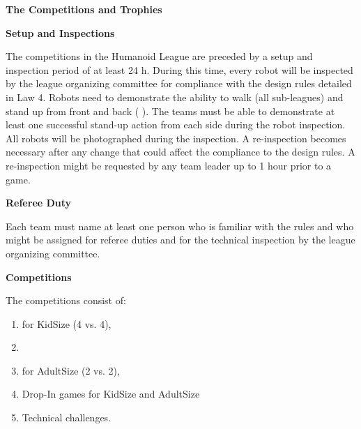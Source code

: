 \clearpage
\sffamily
{\bfseries\color[rgb]{0.4,0.4,0.4}The Competitions and Trophies}
{}


\bigskip

{\bfseries Setup and Inspections}

\headlinebox

The competitions in the Humanoid League are preceded by a setup and inspection
period of at least 24 h.
During this time, every robot will be inspected by the league organizing
committee for compliance with the design rules detailed in Law 4.
Robots need to demonstrate the ability to walk (all sub-leagues) and stand up
from front and back ( ).
The teams must be able to demonstrate at least one successful stand-up action
from each side during the robot inspection.
All robots will be photographed during the inspection.
A re-inspection becomes necessary after any change that could affect the
compliance to the design rules.
A re-inspection might be requested by any team leader up to 1 hour prior to a game.

\bigskip

{\bfseries Referee Duty}

\headlinebox

Each team must name at least one person who is familiar with the rules and who
might be assigned for referee duties and for the technical inspection by the
league organizing committee.

\bigskip

{\bfseries Competitions}

\headlinebox

The competitions consist of:

\begin{enumerate}
\item {}  for KidSize (4 vs. 4),
\item {}
\item {}  for AdultSize (2 vs. 2),
\item Drop-In games for KidSize and AdultSize
\item Technical challenges.
\end{enumerate}

\bigskip

